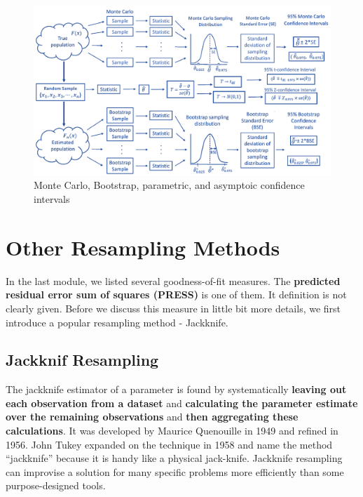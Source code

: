\documentclass[
]{book}
\begin{document}
\begin{figure}

{\centering \includegraphics[width=1\linewidth]{img05/w05-Bootstrap-Monte-Carlo} 

}

\caption{Monte Carlo, Bootstrap, parametric, and asymptoic confidence intervals}\label{fig:unnamed-chunk-97}
\end{figure}

\hfill\break

\hypertarget{other-resampling-methods}{%
\section{Other Resampling Methods}\label{other-resampling-methods}}

In the last module, we listed several goodness-of-fit measures. The \textbf{predicted residual error sum of squares (PRESS)} is one of them. It definition is not clearly given. Before we discuss this measure in little bit more details, we first introduce a popular resampling method - Jackknife.

\hypertarget{jackknif-resampling}{%
\subsection{Jackknif Resampling}\label{jackknif-resampling}}

The jackknife estimator of a parameter is found by systematically \textbf{leaving out each observation from a dataset} and \textbf{calculating the parameter estimate over the remaining observations} and \textbf{then aggregating these calculations}. It was developed by Maurice Quenouille in 1949 and refined in 1956. John Tukey expanded on the technique in 1958 and name the method ``jackknife'' because it is handy like a physical jack-knife. Jackknife resampling can improvise a solution for many specific problems more efficiently than some purpose-designed tools.
\end{document}
